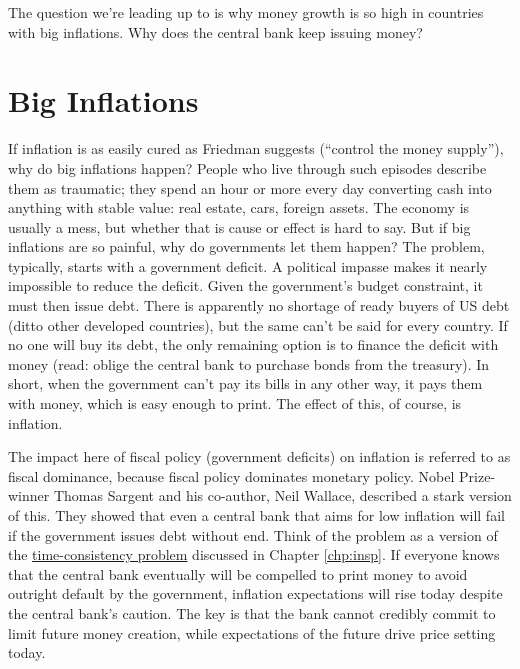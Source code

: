 The question we're leading up to is why money growth is so high
in countries with big inflations.
Why does the central bank keep issuing money?


\section{Big Inflations}

If inflation is as easily cured as Friedman suggests
(``control the money supply''),
why do big inflations happen?
People who live through such
episodes describe them as traumatic; they spend an hour or more
every day converting cash into anything with stable value:  real estate,
cars, foreign assets.
The economy is usually a mess, but whether that is cause or effect is
hard to say.
But if big inflations are so painful, why do governments let them happen?
The problem, typically, starts with a government deficit.
A political impasse makes it nearly impossible to reduce the deficit.
Given the government's budget constraint, it must then issue debt.
There is apparently no shortage of ready buyers of US debt
(ditto other developed countries),
but the same can't be said for every country.
If no one will buy its debt,
the only remaining option is to finance the deficit with money
(read: oblige the central bank to purchase bonds from the treasury).
In short, when the government can't
pay its bills in any other way, it pays them with money, which is
easy enough to print.
The effect of this, of course, is inflation.

The impact here of fiscal policy (government deficits) on inflation
is referred to as fiscal dominance, because fiscal policy dominates monetary policy.
Nobel Prize-winner Thomas Sargent  and his co-author, Neil Wallace,
described a stark version of this.
They showed that even a central bank that aims for low inflation will fail
if the government issues debt without end.
Think of the problem as
a version of the \hyperref[sec:time_cons]{time-consistency problem}
discussed in Chapter \ref{chp:insp}.
If everyone knows that the central bank eventually will be compelled to print money
to avoid outright default by the government, inflation expectations
 will rise today despite the central bank's  caution. The key is
 that the bank cannot credibly commit to limit future money creation, while
 expectations of the future drive price setting today.

